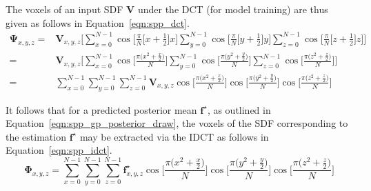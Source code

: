 The voxels of an input SDF \( \bm{V} \) under the DCT (for model training) are thus given 
as follows in Equation~\ref{eqn:spp_dct}.
\begin{align}
  \label{eqn:spp_dct}
  \bm{\Psi}_{x, y, z} ={}& \bm{V}_{x, y, z} \Bigg[
  \sum_{x=0}^{N-1} \cos \Big[ \frac{\pi}{N} \big[ x + \frac{1}{2} \big] x \Big]
  \sum_{y=0}^{N-1} \cos \Big[ \frac{\pi}{N} \big[ y + \frac{1}{2} \big] y \Big]
  \sum_{z=0}^{N-1} \cos \Big[ \frac{\pi}{N} \big[ z + \frac{1}{2} \big] z \Big] \Bigg]\\
  ={}& \bm{V}_{x, y, z} \Bigg[
  \sum_{x=0}^{N-1} \cos \Big[ \frac{\pi \big( x^{2} + \frac{x}{2} \big)}{N} \Big]
  \sum_{y=0}^{N-1} \cos \Big[ \frac{\pi \big( y^{2} + \frac{y}{2} \big)}{N} \Big]
  \sum_{z=0}^{N-1} \cos \Big[ \frac{\pi \big( z^{2} + \frac{z}{2} \big)}{N} \Big] \Bigg]\\
  ={}& \sum_{x=0}^{N-1} \sum_{y=0}^{N-1} \sum_{z=0}^{N-1} \bm{V}_{x, y, z}
  \cos \Big[ \frac{\pi \big( x^{2} + \frac{x}{2} \big)}{N} \Big]
  \cos \Big[ \frac{\pi \big( y^{2} + \frac{y}{2} \big)}{N} \Big]
  \cos \Big[ \frac{\pi \big( z^{2} + \frac{z}{2} \big)}{N} \Big]
\end{align}

It follows that for a predicted posterior mean \( \bm{f}^{\star} \), as outlined in 
Equation~\ref{eqn:spp_gp_posterior_draw}, the voxels of the SDF corresponding to the 
estimation \( \bm{f}^{\star} \) may be extracted via the IDCT as follows in 
Equation~\ref{eqn:spp_idct}.
\begin{equation}
  \label{eqn:spp_idct}
  \bm{\Phi}_{x, y, z} = \sum_{x=0}^{N-1} \sum_{y=0}^{N-1} \sum_{z=0}^{N-1} 
  \bm{f}^{\star}_{x, y, z}
  \cos \Big[ \frac{\pi \big( x^{2} + \frac{x}{2} \big)}{N} \Big]
  \cos \Big[ \frac{\pi \big( y^{2} + \frac{y}{2} \big)}{N} \Big]
  \cos \Big[ \frac{\pi \big( z^{2} + \frac{z}{2} \big)}{N} \Big]
\end{equation}

